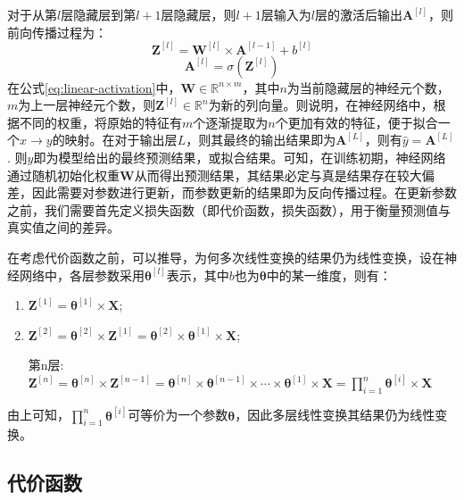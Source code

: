 对于从第$l$层隐藏层到第$l+1$层隐藏层，则$l+1$层输入为$l$层的激活后输出$\mathbf{A}^{[l]}$，则前向传播过程为：
\begin{equation}
  \mathbf{Z}^{[l]} = \mathbf{W}^{[l]} \times \mathbf{A}^{[l - 1]} + b^{[l]}
  \label{eq:linear-activation}
\end{equation}
\begin{equation}
  \mathbf{A}^{[l]} = \sigma (\mathbf{Z}^{[l]})
  \label{eq:nonlinear-activation}
\end{equation}
在公式\ref{eq:linear-activation}中，$\mathbf{W} \in \mathbb{R}^{n \times m}$，其中$n$为当前隐藏层的神经元个数，$m$为上一层神经元个数，则$\mathbf{Z}^{[l]} \in \mathbb{R}^{n}$为新的列向量。则说明，在神经网络中，根据不同的权重，将原始的特征有$m$个逐渐提取为$n$个更加有效的特征，便于拟合一个$x\rightarrow y$的映射。在对于输出层$L$，则其最终的输出结果即为$\mathbf{A}^{[L]}$，则有$\hat{y}=\mathbf{A}^{[L]}$. 则$\hat{y}$即为模型给出的最终预测结果，或拟合结果。可知，在训练初期，神经网络通过随机初始化权重$\mathbf{W}$从而得出预测结果，其结果必定与真是结果存在较大偏差，因此需要对参数进行更新，而参数更新的结果即为反向传播过程。在更新参数之前，我们需要首先定义损失函数（即代价函数，损失函数），用于衡量预测值与真实值之间的差异。

在考虑代价函数之前，可以推导，为何多次线性变换的结果仍为线性变换，设在神经网络中，各层参数采用$\boldsymbol{\theta}^{[l]}$表示，其中$b$也为$\boldsymbol{\theta}$中的某一维度，则有：
\begin{enumerate}[label=第\arabic{*}层: ,itemindent=36pt]
  \item $\mathbf{Z}^{[1]} = \boldsymbol{\theta}^{[1]} \times \mathbf{X}$; 
  \item $\mathbf{Z}^{[2]} = \boldsymbol{\theta}^{[2]} \times \mathbf{Z}^{[1]} = \boldsymbol{\theta}^{[2]} \times \boldsymbol{\theta}^{[1]} \times \mathbf{X}$; 
  \item[第n层:] $\mathbf{Z}^{[n]} = \boldsymbol{\theta}^{[n]} \times \mathbf{Z}^{[n-1]} = \boldsymbol{\theta}^{[n]} \times \boldsymbol{\theta}^{[n-1]} \times \cdots \times \boldsymbol{\theta}^{[1]} \times \mathbf{X} = \prod\limits _{i=1}^n \boldsymbol{\theta}^{[i]} \times \mathbf{X}$
\end{enumerate}

由上可知，$\prod\limits _{i=1}^n \boldsymbol{\theta}^{[i]}$可等价为一个参数$\boldsymbol{\theta}$，因此多层线性变换其结果仍为线性变换。

\subsection{代价函数}

